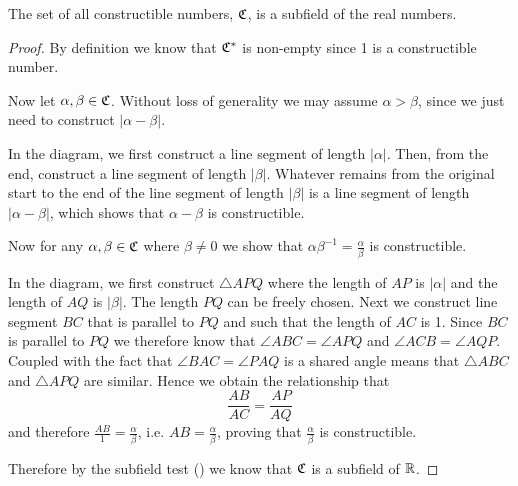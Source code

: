 \begin{theorem}\label{thrm-constructible-numbers-is-subfield-of-real-numbers}
    The set of all constructible numbers, $\mathfrak{C}$, is a subfield of the real numbers.
\end{theorem}
\begin{proof}
    By definition we know that $\mathfrak{C}^\ast$ is non-empty since 1 is a constructible number.

    Now let $\alpha, \beta \in \mathfrak{C}$. Without loss of generality we may assume $\alpha > \beta$, since we just need to construct $|\alpha - \beta|$.
    \begin{figure}[H]
        \centering
    \end{figure}
    In the diagram, we first construct a line segment of length $|\alpha|$. Then, from the end, construct a line segment of length $|\beta|$. Whatever remains from the original start to the end of the line segment of length $|\beta|$ is a line segment of length $|\alpha - \beta|$, which shows that $\alpha - \beta$ is constructible.

    Now for any $\alpha,\beta \in \mathfrak{C}$ where $\beta \neq 0$ we show that $\alpha\beta^{-1} = \frac\alpha\beta$ is constructible.
    \begin{figure}[H]
        \centering
    \end{figure}
    In the diagram, we first construct $\triangle APQ$ where the length of $AP$ is $|\alpha|$ and the length of $AQ$ is $|\beta|$. The length $PQ$ can be freely chosen. Next we construct line segment $BC$ that is parallel to $PQ$ and such that the length of $AC$ is 1. Since $BC$ is parallel to $PQ$ we therefore know that $\angle ABC = \angle APQ$ and $\angle ACB = \angle AQP$. Coupled with the fact that $\angle BAC = \angle PAQ$ is a shared angle means that $\triangle ABC$ and $\triangle APQ$ are similar. Hence we obtain the relationship that
    \[
        \frac{AB}{AC} = \frac{AP}{AQ}
    \]
    and therefore $\frac{AB}{1} = \frac{\alpha}{\beta}$, i.e. $AB = \frac\alpha\beta$, proving that $\frac\alpha\beta$ is constructible.

    Therefore by the subfield test () we know that $\mathfrak{C}$ is a subfield of $\mathbb{R}$.
\end{proof}

